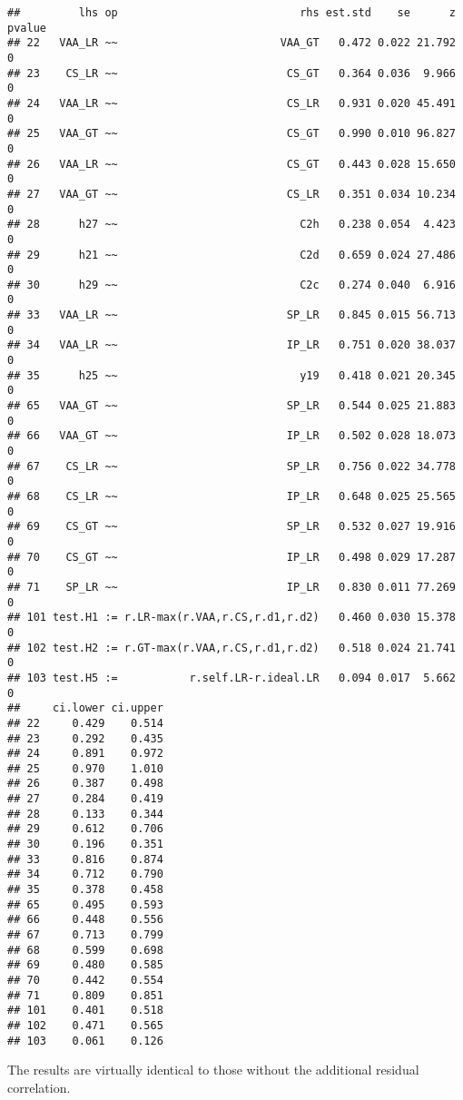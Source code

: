 \documentclass[
]{article}
\begin{document}
\begin{verbatim}
##         lhs op                            rhs est.std    se      z pvalue
## 22   VAA_LR ~~                         VAA_GT   0.472 0.022 21.792      0
## 23    CS_LR ~~                          CS_GT   0.364 0.036  9.966      0
## 24   VAA_LR ~~                          CS_LR   0.931 0.020 45.491      0
## 25   VAA_GT ~~                          CS_GT   0.990 0.010 96.827      0
## 26   VAA_LR ~~                          CS_GT   0.443 0.028 15.650      0
## 27   VAA_GT ~~                          CS_LR   0.351 0.034 10.234      0
## 28      h27 ~~                            C2h   0.238 0.054  4.423      0
## 29      h21 ~~                            C2d   0.659 0.024 27.486      0
## 30      h29 ~~                            C2c   0.274 0.040  6.916      0
## 33   VAA_LR ~~                          SP_LR   0.845 0.015 56.713      0
## 34   VAA_LR ~~                          IP_LR   0.751 0.020 38.037      0
## 35      h25 ~~                            y19   0.418 0.021 20.345      0
## 65   VAA_GT ~~                          SP_LR   0.544 0.025 21.883      0
## 66   VAA_GT ~~                          IP_LR   0.502 0.028 18.073      0
## 67    CS_LR ~~                          SP_LR   0.756 0.022 34.778      0
## 68    CS_LR ~~                          IP_LR   0.648 0.025 25.565      0
## 69    CS_GT ~~                          SP_LR   0.532 0.027 19.916      0
## 70    CS_GT ~~                          IP_LR   0.498 0.029 17.287      0
## 71    SP_LR ~~                          IP_LR   0.830 0.011 77.269      0
## 101 test.H1 := r.LR-max(r.VAA,r.CS,r.d1,r.d2)   0.460 0.030 15.378      0
## 102 test.H2 := r.GT-max(r.VAA,r.CS,r.d1,r.d2)   0.518 0.024 21.741      0
## 103 test.H5 :=           r.self.LR-r.ideal.LR   0.094 0.017  5.662      0
##     ci.lower ci.upper
## 22     0.429    0.514
## 23     0.292    0.435
## 24     0.891    0.972
## 25     0.970    1.010
## 26     0.387    0.498
## 27     0.284    0.419
## 28     0.133    0.344
## 29     0.612    0.706
## 30     0.196    0.351
## 33     0.816    0.874
## 34     0.712    0.790
## 35     0.378    0.458
## 65     0.495    0.593
## 66     0.448    0.556
## 67     0.713    0.799
## 68     0.599    0.698
## 69     0.480    0.585
## 70     0.442    0.554
## 71     0.809    0.851
## 101    0.401    0.518
## 102    0.471    0.565
## 103    0.061    0.126
\end{verbatim}

The results are virtually identical to those without the additional
residual correlation.
\end{document}
